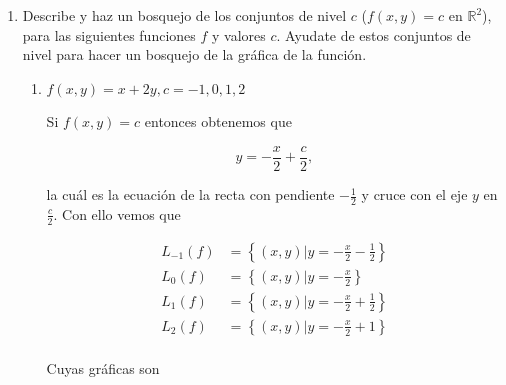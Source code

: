 \documentclass[letterpaper]{article}
\theoremstyle{definition}
\theoremstyle{lemathm}
\theoremstyle{lemathm}
\theoremstyle{lemathm}
\theoremstyle{lemademthm}
\newcommand{\pars}[1]{\left( #1 \right) }
\newcommand{\inprod}[1]{\left\langle #1 \right\rangle }
\newcommand{\norm}[1]{\left\lVert#1\right\rVert}
\newcommand{\set}[1]{\left \{ #1 \right\} }
\newcommand{\RR}{\mathbb{R}}
\newcommand{\1}{\mathbbm{1}}
\begin{document}
\begin{enumerate}
\begin{enumerate}
\begin{proof}
				\begin{align*}
					f(X) - g_A(X) &= \norm{X}^2 - \pars{\norm{A}^2 + 2\inprod{A,X-A}}\\
					&= \norm{X}^2 - \pars{\norm{A}^2 + 2\inprod{A,U} +\norm{U}^2} + \norm{U}^2\\
					&= \norm{X}^2 - \norm{A+U} + \norm{U}^2\\
					&= \norm{U}^2
				\end{align*}
			\end{proof}
			\item Demuestra que la diferencia entre $f(X)$ y $g_a(X)$ no excede $10^{-4}$ cuando $\norm{X-A}<10^{-2}$.
			\begin{proof}
				Puesto que $f(X) - g_A(X) = \norm{X-A}^2$ y tenemos que $\norm{X-A}<10^{-2}$, al ser el cuadrado una función montona creciente concluimos que

				\[f(X) - g_A(X) < 10^{-4}.\]
			\end{proof}
		\end{enumerate}

		\newpage
		\item Describe y haz un bosquejo de los conjuntos de nivel $c$ ($f(x,y)=c$ en $\RR^2$), para las siguientes funciones $f$ y valores $c$. Ayudate de estos conjuntos de nivel para hacer un bosquejo de la gráfica de la función.
		\begin{enumerate}
			\item $f(x,y)=x+2y, c=-1,0,1,2$
			
			Si $f(x,y)=c$ entonces obtenemos que

			\[y = -\frac{x}{2} + \frac{c}{2},\]

			la cuál es la ecuación de la recta con pendiente $-\frac{1}{2}$ y cruce con el eje $y$ en $\frac{c}{2}$. Con ello vemos que

			\begin{align*}
				L_{-1}(f) &= \set{(x,y) | y = -\frac{x}{2} - \frac{1}{2}}\\
				L_{0}(f) &= \set{(x,y) | y = -\frac{x}{2}}\\
				L_{1}(f) &= \set{(x,y) | y = -\frac{x}{2} + \frac{1}{2}}\\
				L_{2}(f) &= \set{(x,y) | y = -\frac{x}{2} + 1}\\
			\end{align*}

			Cuyas gráficas son


\end{enumerate}
\end{enumerate}
\end{document}
